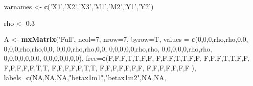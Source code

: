 \documentclass[]{article}
\newenvironment{Shaded}{\begin{snugshade}}{\end{snugshade}}
\newcommand{\KeywordTok}[1]{\textcolor[rgb]{0.13,0.29,0.53}{\textbf{#1}}}
\newcommand{\DataTypeTok}[1]{\textcolor[rgb]{0.13,0.29,0.53}{#1}}
\newcommand{\DecValTok}[1]{\textcolor[rgb]{0.00,0.00,0.81}{#1}}
\newcommand{\FloatTok}[1]{\textcolor[rgb]{0.00,0.00,0.81}{#1}}
\newcommand{\StringTok}[1]{\textcolor[rgb]{0.31,0.60,0.02}{#1}}
\newcommand{\OtherTok}[1]{\textcolor[rgb]{0.56,0.35,0.01}{#1}}
\newcommand{\NormalTok}[1]{#1}
\begin{document}
\begin{Shaded}
\begin{Highlighting}[]
\NormalTok{varnames <-}\StringTok{ }\KeywordTok{c}\NormalTok{(}\StringTok{'X1'}\NormalTok{,}\StringTok{'X2'}\NormalTok{,}\StringTok{'X3'}\NormalTok{,}\StringTok{'M1'}\NormalTok{,}\StringTok{'M2'}\NormalTok{,}\StringTok{'Y1'}\NormalTok{,}\StringTok{'Y2'}\NormalTok{)}

\NormalTok{rho <-}\StringTok{ }\FloatTok{0.3}

\NormalTok{A <-}\StringTok{ }\KeywordTok{mxMatrix}\NormalTok{(}\StringTok{'Full'}\NormalTok{, }\DataTypeTok{ncol=}\DecValTok{7}\NormalTok{, }\DataTypeTok{nrow=}\DecValTok{7}\NormalTok{, }\DataTypeTok{byrow=}\NormalTok{T,}
              \DataTypeTok{values =} \KeywordTok{c}\NormalTok{(}\DecValTok{0}\NormalTok{,}\DecValTok{0}\NormalTok{,}\DecValTok{0}\NormalTok{,rho,rho,}\DecValTok{0}\NormalTok{,}\DecValTok{0}\NormalTok{,}
                         \DecValTok{0}\NormalTok{,}\DecValTok{0}\NormalTok{,}\DecValTok{0}\NormalTok{,rho,rho,}\DecValTok{0}\NormalTok{,}\DecValTok{0}\NormalTok{,}
                         \DecValTok{0}\NormalTok{,}\DecValTok{0}\NormalTok{,}\DecValTok{0}\NormalTok{,rho,rho,}\DecValTok{0}\NormalTok{,}\DecValTok{0}\NormalTok{,}
                         \DecValTok{0}\NormalTok{,}\DecValTok{0}\NormalTok{,}\DecValTok{0}\NormalTok{,}\DecValTok{0}\NormalTok{,}\DecValTok{0}\NormalTok{,rho,rho,}
                         \DecValTok{0}\NormalTok{,}\DecValTok{0}\NormalTok{,}\DecValTok{0}\NormalTok{,}\DecValTok{0}\NormalTok{,}\DecValTok{0}\NormalTok{,rho,rho,}
                         \DecValTok{0}\NormalTok{,}\DecValTok{0}\NormalTok{,}\DecValTok{0}\NormalTok{,}\DecValTok{0}\NormalTok{,}\DecValTok{0}\NormalTok{,}\DecValTok{0}\NormalTok{,}\DecValTok{0}\NormalTok{,}
                         \DecValTok{0}\NormalTok{,}\DecValTok{0}\NormalTok{,}\DecValTok{0}\NormalTok{,}\DecValTok{0}\NormalTok{,}\DecValTok{0}\NormalTok{,}\DecValTok{0}\NormalTok{,}\DecValTok{0}\NormalTok{),}
              \DataTypeTok{free=}\KeywordTok{c}\NormalTok{(F,F,F,T,T,F,F,}
\NormalTok{                     F,F,F,T,T,F,F,}
\NormalTok{                     F,F,F,T,T,F,F,}
\NormalTok{                     F,F,F,F,F,T,T,}
\NormalTok{                     F,F,F,F,F,T,T,}
\NormalTok{                     F,F,F,F,F,F,F,}
\NormalTok{                     F,F,F,F,F,F,F}
\NormalTok{              ),}
              \DataTypeTok{labels=}\KeywordTok{c}\NormalTok{(}\OtherTok{NA}\NormalTok{,}\OtherTok{NA}\NormalTok{,}\OtherTok{NA}\NormalTok{,}\StringTok{"betax1m1"}\NormalTok{,}\StringTok{"betax1m2"}\NormalTok{,}\OtherTok{NA}\NormalTok{,}\OtherTok{NA}\NormalTok{,}

\end{Highlighting}
\end{Shaded}
\end{document}
